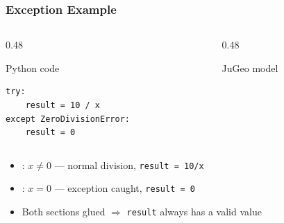 \begin{frame}[fragile]
\frametitle{Exception Example}
\begin{columns}[T]
\begin{column}{0.48\textwidth}
\begin{exampleblock}{Python code}
\begin{lstlisting}
try:
    result = 10 / x
except ZeroDivisionError:
    result = 0
\end{lstlisting}
\end{exampleblock}
\end{column}
\begin{column}{0.48\textwidth}
\begin{block}{JuGeo model}
\end{block}
\end{column}
\end{columns}
\vfill
\begin{itemize}
  \item {}: $x \neq 0$ --- normal division, \texttt{result = 10/x}
  \item {}: $x = 0$ --- exception caught, \texttt{result = 0}
  \item Both sections glued $\Rightarrow$ \texttt{result} always has a valid value
\end{itemize}
\end{frame}

